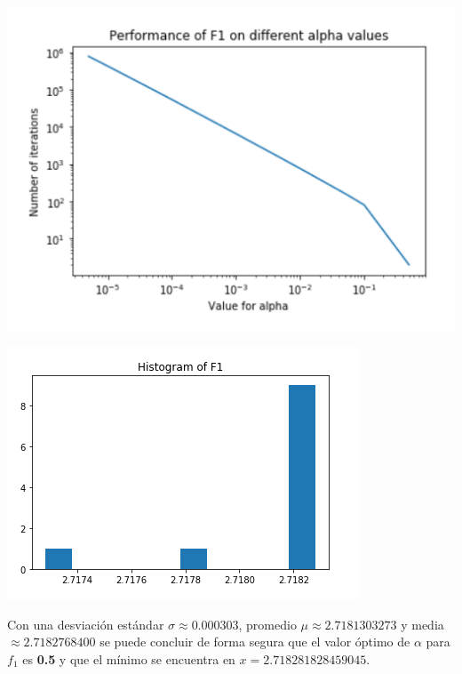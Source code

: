 \documentclass[10pt,letterpaper]{article}
\begin{document}
\begin{enumerate}
\begin{enumerate}
                    \begin{multicols}{2}
                        \begin{center}
                            \includegraphics[scale=.4]{assets/theory/1-a/f1-performance.png}
                        \end{center}
                        \begin{center}
                            \includegraphics[scale=.5]{assets/theory/1-a/f1-dist.png}
                        \end{center}
                    \end{multicols}

                    Con una desviación estándar $\sigma \approx 0.000303$,
                    promedio $\mu \approx 2.7181303273$ y media $\approx 2.7182768400$
                    se puede concluir de forma segura que el valor óptimo de $\alpha$ para
                    $f_1$ es \textbf{0.5} y que el mínimo se encuentra en
                    $x=2.718281828459045$.


\end{enumerate}
\end{enumerate}
\end{document}
